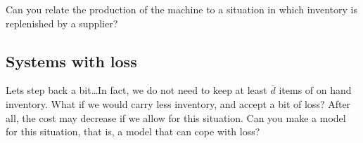 \begin{exercise}
  Can you relate the production of the machine to a situation in which
  inventory is replenished by a supplier?

\end{exercise}

\subsection{Systems with loss}
\label{sec:real-that-prev}

\begin{exercise}
  Lets step back a bit\ldots In fact, we do not need to keep at least
  $\bar d$ items of on hand inventory. What if we would carry less
  inventory, and accept a bit of loss?  After all, the cost may
  decrease if we allow for this situation. Can you make a model for
  this situation, that is, a model that can cope with loss?

\end{exercise}

